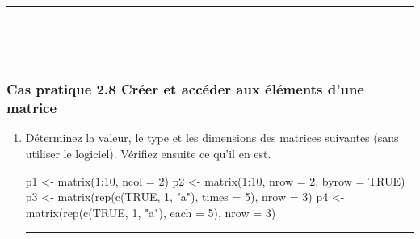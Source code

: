 \documentclass[12pt,twosided, notitlepage]{book}
\newenvironment{Shaded}{}{}
\newcommand{\KeywordTok}[1]{\textcolor[rgb]{0.00,0.00,1.00}{{#1}}}
\newcommand{\DataTypeTok}[1]{{#1}}
\newcommand{\DecValTok}[1]{{#1}}
\newcommand{\StringTok}[1]{\textcolor[rgb]{0.00,0.50,0.50}{{#1}}}
\newcommand{\OtherTok}[1]{\textcolor[rgb]{1.00,0.25,0.00}{{#1}}}
\newcommand{\NormalTok}[1]{{#1}}
\newif \ifsol
\renewenvironment{Shaded}{\begin{snugshade}}{\end{snugshade}}
\begin{document}
\begin{center}\rule{0.5\linewidth}{\linethickness}\end{center}

~

~

\subsubsection{\texorpdfstring{\textbf{Cas pratique 2.8} Créer et
accéder aux éléments d'une
matrice}{Cas pratique 2.8 Créer et accéder aux éléments d'une matrice}}\label{cas-pratique-2.8-creer-et-acceder-aux-elements-dune-matrice}


\begin{enumerate}
\def\labelenumi{\alph{enumi}.}
\item
  Déterminez la valeur, le type et les dimensions des matrices suivantes
  (sans utiliser le logiciel). Vérifiez ensuite ce qu'il en
  est.

\begin{Shaded}
\begin{Highlighting}[]
\NormalTok{p1 <-}\StringTok{ }\KeywordTok{matrix}\NormalTok{(}\DecValTok{1}\NormalTok{:}\DecValTok{10}\NormalTok{, }\DataTypeTok{ncol =} \DecValTok{2}\NormalTok{)}
\NormalTok{p2 <-}\StringTok{ }\KeywordTok{matrix}\NormalTok{(}\DecValTok{1}\NormalTok{:}\DecValTok{10}\NormalTok{, }\DataTypeTok{nrow =} \DecValTok{2}\NormalTok{, }\DataTypeTok{byrow =} \OtherTok{TRUE}\NormalTok{)}
\NormalTok{p3 <-}\StringTok{ }\KeywordTok{matrix}\NormalTok{(}\KeywordTok{rep}\NormalTok{(}\KeywordTok{c}\NormalTok{(}\OtherTok{TRUE}\NormalTok{, }\DecValTok{1}\NormalTok{, }\StringTok{"a"}\NormalTok{), }\DataTypeTok{times =} \DecValTok{5}\NormalTok{), }\DataTypeTok{nrow =} \DecValTok{3}\NormalTok{)}
\NormalTok{p4 <-}\StringTok{ }\KeywordTok{matrix}\NormalTok{(}\KeywordTok{rep}\NormalTok{(}\KeywordTok{c}\NormalTok{(}\OtherTok{TRUE}\NormalTok{, }\DecValTok{1}\NormalTok{, }\StringTok{"a"}\NormalTok{), }\DataTypeTok{each =} \DecValTok{5}\NormalTok{), }\DataTypeTok{nrow =} \DecValTok{3}\NormalTok{)}
\end{Highlighting}
\end{Shaded}

  \ifsol 

  \begin{center} \rule{0.5\linewidth}{\linethickness}\end{center}


\end{enumerate}
\end{document}
